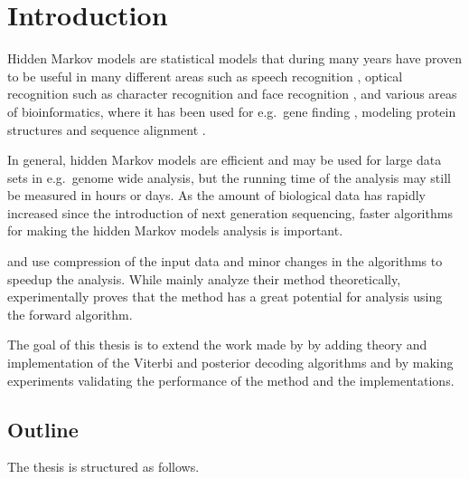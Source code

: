 \chapter{Introduction}

Hidden Markov models are statistical models that during many years have proven
to be useful in many different areas such as speech recognition
\citep{rabiner1989tutorial}, optical recognition such as character recognition
\citep{agazzi1993hidden} and face recognition \citep{nefian1998hidden}, and
various areas of bioinformatics, where it has been used for e.g.\ gene finding
\citep{burge1997prediction}, modeling protein structures and sequence alignment
\citep{eddy1998profile}.

In general, hidden Markov models are efficient and may be used for large data
sets in e.g.\ genome wide analysis, but the running time of the analysis may
still be measured in hours or days. As the amount of biological data has
rapidly increased since the introduction of next generation sequencing, faster
algorithms for making the hidden Markov models analysis is important.

\citet{lifshits2009speeding} and \citet{sand2013ziphmmlib} use compression of
the input data and minor changes in the algorithms to speedup the
analysis. While \citet{lifshits2009speeding} mainly analyze their method
theoretically, \citet{sand2013ziphmmlib} experimentally proves that the method
has a great potential for analysis using the forward algorithm.

The goal of this thesis is to extend the work made by \citet{sand2013ziphmmlib}
by adding theory and implementation of the Viterbi and posterior decoding
algorithms and by making experiments validating the performance of the method
and the implementations.

\section{Outline}

The thesis is structured as follows.

